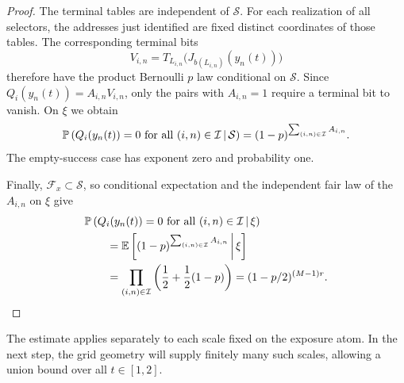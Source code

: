 \begin{proof}
The terminal tables are independent of \(\mathcal S\).
For each realization of all selectors, the addresses just identified
are fixed distinct coordinates of those tables.  The corresponding
terminal bits
\[
 V_{i,n}=
 T_{L_{i,n}}\bigl(J_{b(L_{i,n})}(y_n(t))\bigr)
\]
therefore have the product Bernoulli \(p\) law conditional on
\(\mathcal S\).  Since \(Q_i(y_n(t))=A_{i,n}V_{i,n}\),
only the pairs with \(A_{i,n}=1\) require a terminal bit to vanish.
On \(\xi\) we obtain
\[
 \mathbb P\left(
 Q_i(y_n(t))=0\text{ for all }(i,n)\in\mathcal I
 \,\middle|\,\mathcal S
 \right)
 =(1-p)^{\sum_{(i,n)\in\mathcal I}A_{i,n}}.
\]
The empty-success case has exponent zero and probability one.

Finally, \(\mathcal F_x\subset\mathcal S\), so conditional expectation
and the independent fair law of the \(A_{i,n}\) on \(\xi\) give
\begin{align*}
 &\mathbb P\left(
 Q_i(y_n(t))=0\text{ for all }(i,n)\in\mathcal I
 \,\middle|\,\xi
 \right)\\
 &\qquad=
 \mathbb E\left[(1-p)^{\sum_{(i,n)\in\mathcal I}A_{i,n}}
          \,\middle|\,\xi\right]\\
 &\qquad=
 \prod_{(i,n)\in\mathcal I}
 \left(\frac12+\frac12(1-p)\right)
 =(1-p/2)^{(M-1)r}.
\end{align*}
\end{proof}

The estimate applies separately to each scale fixed on the exposure
atom.  In the next step, the grid geometry will supply finitely many
such scales, allowing a union bound over all \(t\in[1,2]\).
